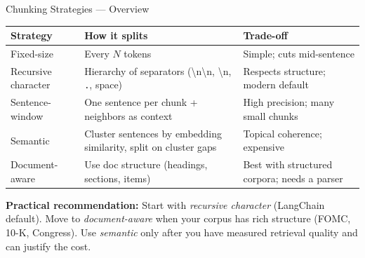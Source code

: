 \documentclass[10pt,english,aspectratio=169]{beamer}
\begin{document}
\begin{frame}{Chunking Strategies --- Overview}
\begin{center}
\renewcommand{\arraystretch}{1.35}
\begin{tabular}{|p{3.0cm}|p{5.0cm}|p{5.5cm}|}
\hline
\textbf{Strategy} & \textbf{How it splits} & \textbf{Trade-off} \\
\hline
Fixed-size & Every $N$ tokens & Simple; cuts mid-sentence \\
\hline
Recursive character & Hierarchy of separators (\textbackslash n\textbackslash n, \textbackslash n, \texttt{.}, space) & Respects structure; modern default \\
\hline
Sentence-window & One sentence per chunk + neighbors as context & High precision; many small chunks \\
\hline
Semantic & Cluster sentences by embedding similarity, split on cluster gaps & Topical coherence; expensive \\
\hline
Document-aware & Use doc structure (headings, sections, items) & Best with structured corpora; needs a parser \\
\hline
\end{tabular}
\end{center}

\bigskip
\textbf{Practical recommendation:} Start with \emph{recursive character} (LangChain default). Move to \emph{document-aware} when your corpus has rich structure (FOMC, 10-K, Congress). Use \emph{semantic} only after you have measured retrieval quality and can justify the cost.
\end{frame}
\end{document}
